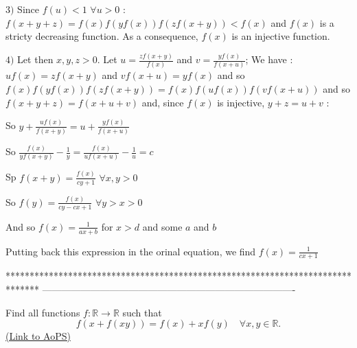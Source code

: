 \begin{mysolution}
$ 3)$ Since $ f(u)<1$ $ \forall u>0$ : $ f(x+y+z)=f(x)f(yf(x))f(zf(x+y))< f(x)$ and $ f(x)$ is a stricty decreasing function.
As a consequence, $ f(x)$ is an injective function.

$ 4)$ Let then $ x,y,z>0$. Let $ u=\frac{zf(x+y)}{f(x)}$ and $ v=\frac{yf(x)}{f(x+u)}$; We have :
$ uf(x)=zf(x+y)$ and $ vf(x+u)=yf(x)$ and so $ f(x)f(yf(x))f(zf(x+y))=f(x)f(uf(x))f(vf(x+u))$ and so
$ f(x+y+z)=f(x+u+v)$ and, since $ f(x)$ is injective, $ y+z=u+v$ :

So $ y+\frac{uf(x)}{f(x+y)}=u+\frac{yf(x)}{f(x+u)}$

So $ \frac{f(x)}{yf(x+y)}-\frac{1}{y}=\frac{f(x)}{uf(x+u)}-\frac{1}{u}=c$

Sp $ f(x+y)=\frac{f(x)}{cy+1}$ $ \forall x,y>0$

So $ f(y)=\frac{f(x)}{cy-cx+1}$ $ \forall y>x>0$

And so $ f(x)=\frac{1}{ax+b}$ for $ x>d$ and some $ a$ and $ b$

Putting back this expression in the orinal equation, we find $ \boxed{f(x)=\frac{1}{cx+1}}$
\end{mysolution}
*******************************************************************************
-------------------------------------------------------------------------------

\begin{problem}
	Find all functions $ f: \mathbb{R}\to\mathbb{R}$ such that \[ f(x+f(xy))=f(x)+xf(y)\quad \forall x,y\in\mathbb{R}.\]
	\flushright \href{https://artofproblemsolving.com/community/c6h172996}{(Link to AoPS)}
\end{problem}



